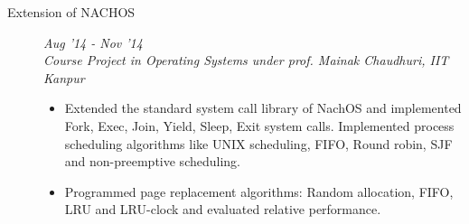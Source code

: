 \documentclass[9pt]{article}
\newenvironment{changemargin}[2]{%
  \begin{list}{}{%
    \setlength{\topsep}{0pt}%
    \setlength{\leftmargin}{#1}%
    \setlength{\rightmargin}{#2}%
    \setlength{\listparindent}{\parindent}%
    \setlength{\itemindent}{\parindent}%
    \setlength{\parsep}{\parskip}%
  }%
  \item[]}{\end{list}
}
\newenvironment{body} {
	\vspace*{-16pt}
	\begin{changemargin}{-0.6in}{-0.65in}
  }	
	{\end{changemargin}
}
\begin{document}
\begin{body}
\begin{description}
	\item[\normalsize{Extension of NACHOS}]  \hfill \textit{Aug '14 - Nov '14} \\
	\textit{Course Project in Operating Systems under prof. Mainak Chaudhuri, IIT Kanpur}
	\begin{itemize}
	 \item Extended the standard system call library of NachOS and implemented Fork, Exec, Join, Yield, Sleep, Exit system calls. Implemented process scheduling algorithms like UNIX scheduling, FIFO, Round robin, SJF and non-preemptive scheduling.
	 \item Programmed page replacement algorithms: Random allocation, FIFO, LRU and LRU-clock and evaluated relative performance.
	\end{itemize}
	

	 
 

\end{description}
\end{body}
\end{document}

